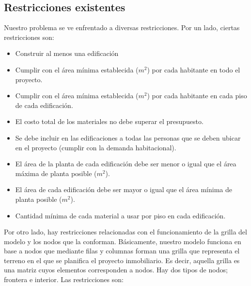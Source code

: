 \documentclass[letterpaper]{article}
\begin{document}
\subsection{Restricciones existentes}
Nuestro problema se ve enfrentado a diversas restricciones. Por un lado, ciertas restricciones son:
\begin{itemize}
	\setlength\itemsep{0.0003em}
	\item Construir al menos una edificación
	\item Cumplir con el área mínima establecida ($m^{2}$) por cada habitante en todo el proyecto.
	\item Cumplir con el área mínima establecida ($m^{2}$) por cada habitante en cada piso de cada edificación.
	\item El costo total de los materiales no debe superar el presupuesto.
	\item Se debe incluir en las edificaciones a todas las personas que se deben ubicar en el proyecto (cumplir con la demanda habitacional).
	\item El área de la planta de cada edificación debe ser menor o igual que el área máxima de planta posible ($m^{2}$).
	\item El área de cada edificación debe ser mayor o igual que el área mínima de planta posible ($m^{2}$).
	\item Cantidad mínima de cada material a usar por piso en cada edificación.
\end{itemize}
Por otro lado, hay restricciones relacionadas con el funcionamiento de la grilla del modelo y los nodos que la conforman. Básicamente,
nuestro modelo funciona en base a nodos que mediante filas y columnas forman una grilla que representa el terreno en el que se planifica el proyecto inmobiliario.
Es decir, aquella grilla es una matriz cuyos elementos corresponden a nodos. Hay dos tipos de nodos; frontera e interior. Las restricciones son:
\end{document}
